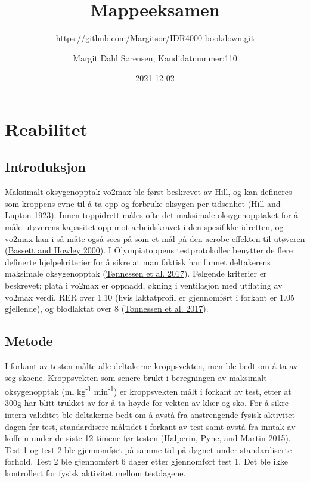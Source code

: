 \documentclass[
]{book}
\title{Mappeeksamen}
\subtitle{\url{https://github.com/Margitsor/IDR4000-bookdown.git}}
\author{Margit Dahl Sørensen, Kandidatnummer:110}
\date{2021-12-02}
\begin{document}
\frontmatter
\maketitle

\mainmatter
\hypertarget{reabilitet}{%
\chapter{Reabilitet}\label{reabilitet}}

\hypertarget{introduksjon}{%
\section{Introduksjon}\label{introduksjon}}

Maksimalt oksygenopptak vo2max ble først beskrevet av Hill, og kan
defineres som kroppens evne til å ta opp og forbruke oksygen per
tidsenhet (\protect\hyperlink{ref-hill1923}{Hill and Lupton 1923}).
Innen toppidrett måles ofte det maksimale oksygenopptaket for å måle
utøverens kapasitet opp mot arbeidskravet i den spesifikke idretten, og
vo2max kan i så måte også sees på som et mål på den aerobe effekten til
utøveren (\protect\hyperlink{ref-bassett2000}{Bassett and Howley 2000}).
I Olympiatoppens testprotokoller benytter de flere definerte
hjelpekriterier for å sikre at man faktisk har funnet deltakerens
maksimale oksygenopptak
(\protect\hyperlink{ref-tuxf8nnessen2017}{Tønnessen et al. 2017}).
Følgende kriterier er beskrevet; platå i vo2max er oppnådd, økning i
ventilasjon med utflating av vo2max verdi, RER over 1.10 (hvis
laktatprofil er gjennomført i forkant er 1.05 gjellende), og blodlaktat
over 8 (\protect\hyperlink{ref-tuxf8nnessen2017}{Tønnessen et al.
2017}).

\hypertarget{metode}{%
\section{Metode}\label{metode}}

I forkant av testen målte alle deltakerne kroppsvekten, men ble bedt om
å ta av seg skoene. Kroppsvekten som senere brukt i beregningen av
maksimalt oksygenopptak (ml kg\textsuperscript{-1}
min\textsuperscript{-1}) er kroppsvekten målt i forkant av test, etter
at 300g har blitt trukket av for å ta høyde for vekten av klær og sko.
For å sikre intern validitet ble deltakerne bedt om å avstå fra
anstrengende fysisk aktivitet dagen før test, standardisere måltidet i
forkant av test samt avstå fra inntak av koffein under de siste 12
timene før testen (\protect\hyperlink{ref-halperin2015}{Halperin, Pyne,
and Martin 2015}). Test 1 og test 2 ble gjennomført på samme tid på
døgnet under standardiserte forhold. Test 2 ble gjennomført 6 dager
etter gjennomført test 1. Det ble ikke kontrollert for fysisk aktivitet
mellom testdagene.
\end{document}
